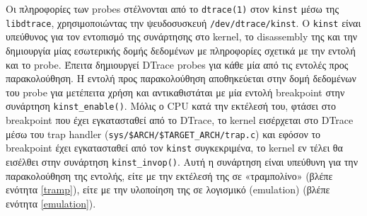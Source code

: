 \documentclass[12pt]{article}
\begin{document}
Οι πληροφορίες των probes στέλνονται από το \lstinline{dtrace(1)} στον
\lstinline{kinst} μέσω της \lstinline{libdtrace}, χρησιμοποιώντας την
ψευδοσυσκευή \lstinline{/dev/dtrace/kinst}. Ο \lstinline{kinst} είναι υπεύθυνος
για τον εντοπισμό της συνάρτησης στο kernel, το disassembly της και την
δημιουργία μίας εσωτερικής δομής δεδομένων με πληροφορίες σχετικά με την εντολή
και το probe. Έπειτα δημιουργεί DTrace probes για κάθε μία από τις εντολές προς
παρακολούθηση. Η εντολή προς παρακολούθηση αποθηκεύεται στην δομή δεδομένων του
probe για μετέπειτα χρήση και αντικαθιστάται με μία εντολή breakpoint στην
συνάρτηση \lstinline{kinst_enable()}. Μόλις ο CPU κατά την εκτέλεσή του, φτάσει
στο breakpoint που έχει εγκατασταθεί από το DTrace, το kernel εισέρχεται στο
DTrace μέσω του trap handler (\lstinline{sys/$ARCH/$TARGET_ARCH/trap.c})
\cite{trap} και εφόσον το breakpoint έχει εγκατασταθεί από τον
\lstinline{kinst} συγκεκριμένα, το kernel εν τέλει θα εισέλθει στην συνάρτηση
\lstinline{kinst_invop()}. Αυτή η συνάρτηση είναι υπεύθυνη για την
παρακολούθηση της εντολής, είτε με την εκτέλεσή της σε «τραμπολίνο» (βλέπε
ενότητα \ref{tramp}), είτε με την υλοποίηση της σε λογισμικό (emulation) (βλέπε
ενότητα \ref{emulation}).
\end{document}
